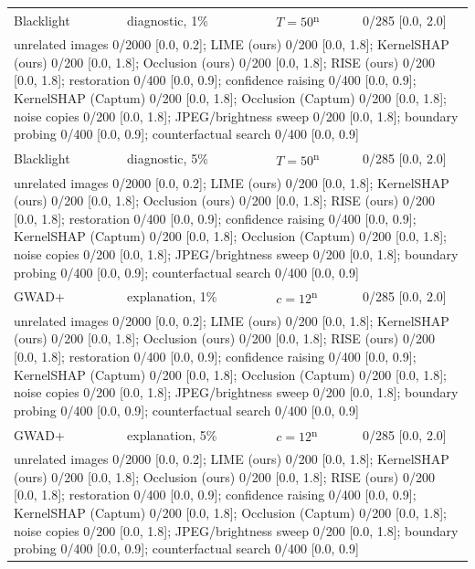 \begin{footnotesize}
\begin{longtable}{p{1.6cm}p{2.6cm}p{2.8cm}p{4.6cm}}
Blacklight & diagnostic, 1\% & $T=50$\textsuperscript{n} & 0/285 [0.0, 2.0] \\
\multicolumn{4}{p{12.8cm}}{\raggedright\quad unrelated images 0/2000 [0.0, 0.2]; LIME (ours) 0/200 [0.0, 1.8]; KernelSHAP (ours) 0/200 [0.0, 1.8]; Occlusion (ours) 0/200 [0.0, 1.8]; RISE (ours) 0/200 [0.0, 1.8]; restoration 0/400 [0.0, 0.9]; confidence raising 0/400 [0.0, 0.9]; KernelSHAP (Captum) 0/200 [0.0, 1.8]; Occlusion (Captum) 0/200 [0.0, 1.8]; noise copies 0/200 [0.0, 1.8]; JPEG/brightness sweep 0/200 [0.0, 1.8]; boundary probing 0/400 [0.0, 0.9]; counterfactual search 0/400 [0.0, 0.9]} \\[4pt]
Blacklight & diagnostic, 5\% & $T=50$\textsuperscript{n} & 0/285 [0.0, 2.0] \\
\multicolumn{4}{p{12.8cm}}{\raggedright\quad unrelated images 0/2000 [0.0, 0.2]; LIME (ours) 0/200 [0.0, 1.8]; KernelSHAP (ours) 0/200 [0.0, 1.8]; Occlusion (ours) 0/200 [0.0, 1.8]; RISE (ours) 0/200 [0.0, 1.8]; restoration 0/400 [0.0, 0.9]; confidence raising 0/400 [0.0, 0.9]; KernelSHAP (Captum) 0/200 [0.0, 1.8]; Occlusion (Captum) 0/200 [0.0, 1.8]; noise copies 0/200 [0.0, 1.8]; JPEG/brightness sweep 0/200 [0.0, 1.8]; boundary probing 0/400 [0.0, 0.9]; counterfactual search 0/400 [0.0, 0.9]} \\[4pt]
GWAD+ & explanation, 1\% & $c=12$\textsuperscript{n} & 0/285 [0.0, 2.0] \\
\multicolumn{4}{p{12.8cm}}{\raggedright\quad unrelated images 0/2000 [0.0, 0.2]; LIME (ours) 0/200 [0.0, 1.8]; KernelSHAP (ours) 0/200 [0.0, 1.8]; Occlusion (ours) 0/200 [0.0, 1.8]; RISE (ours) 0/200 [0.0, 1.8]; restoration 0/400 [0.0, 0.9]; confidence raising 0/400 [0.0, 0.9]; KernelSHAP (Captum) 0/200 [0.0, 1.8]; Occlusion (Captum) 0/200 [0.0, 1.8]; noise copies 0/200 [0.0, 1.8]; JPEG/brightness sweep 0/200 [0.0, 1.8]; boundary probing 0/400 [0.0, 0.9]; counterfactual search 0/400 [0.0, 0.9]} \\[4pt]
GWAD+ & explanation, 5\% & $c=12$\textsuperscript{n} & 0/285 [0.0, 2.0] \\
\multicolumn{4}{p{12.8cm}}{\raggedright\quad unrelated images 0/2000 [0.0, 0.2]; LIME (ours) 0/200 [0.0, 1.8]; KernelSHAP (ours) 0/200 [0.0, 1.8]; Occlusion (ours) 0/200 [0.0, 1.8]; RISE (ours) 0/200 [0.0, 1.8]; restoration 0/400 [0.0, 0.9]; confidence raising 0/400 [0.0, 0.9]; KernelSHAP (Captum) 0/200 [0.0, 1.8]; Occlusion (Captum) 0/200 [0.0, 1.8]; noise copies 0/200 [0.0, 1.8]; JPEG/brightness sweep 0/200 [0.0, 1.8]; boundary probing 0/400 [0.0, 0.9]; counterfactual search 0/400 [0.0, 0.9]} \\[4pt]

\end{longtable}
\end{footnotesize}

